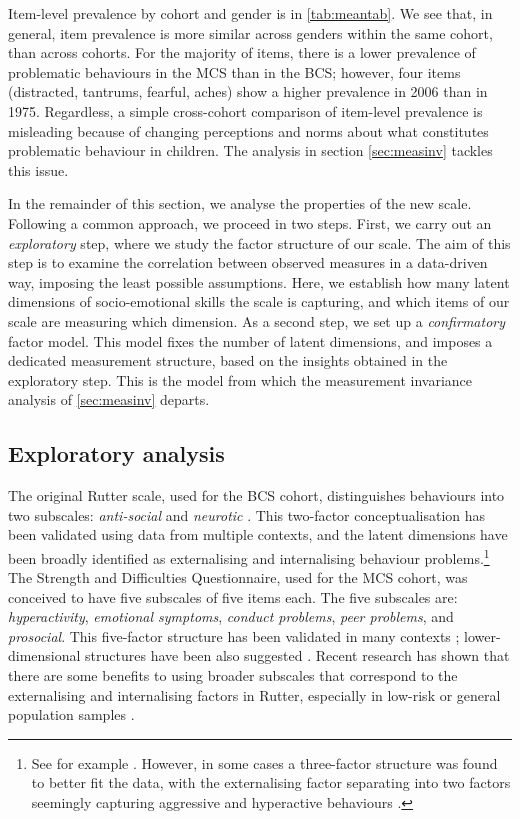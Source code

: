 Item-level prevalence by cohort and gender is in \autoref{tab:meantab}. We see that, in general, item prevalence is more similar across genders within the same cohort, than across cohorts. For the majority of items, there is a lower prevalence of problematic behaviours in the MCS than in the BCS; however, four items (distracted, tantrums, fearful, aches) show a higher prevalence in 2006 than in 1975. Regardless, a simple cross-cohort comparison of item-level prevalence is misleading because of changing perceptions and norms about what constitutes problematic behaviour in children. The analysis in section \ref{sec:measinv} tackles this issue.

In the remainder of this section, we analyse the properties of the new scale. Following a common approach, we proceed in two steps. First, we carry out an \emph{exploratory} step, where we study the factor structure of our scale. The aim of this step is to examine the correlation between observed measures in a data-driven way, imposing the least possible assumptions. Here, we establish how many latent dimensions of socio-emotional skills the scale is capturing, and which items of our scale are measuring which dimension. As a second step, we set up a \emph{confirmatory} factor model. This model fixes the number of latent dimensions, and imposes a dedicated measurement structure, based on the insights obtained in the exploratory step. This is the model from which the measurement invariance analysis of \autoref{sec:measinv} departs.


\subsection{Exploratory analysis \label{sec:ea}}

The original Rutter scale, used for the BCS cohort, distinguishes behaviours into two subscales: \emph{anti-social} and \emph{neurotic} \citep{Rutter1970}. This two-factor conceptualisation has been validated using data from multiple contexts, and the latent dimensions have been broadly identified as externalising and internalising behaviour problems.\footnote{See for example \citet{Fowler1979,Venables1983,Tremblay1987,Berglund1999,Klein2009}. However, in some cases a three-factor structure was found to better fit the data, with the externalising factor separating into two factors seemingly capturing aggressive and hyperactive behaviours \citep{Behar1974,McGee1985}.} The Strength and Difficulties Questionnaire, used for the MCS cohort, was conceived to have five subscales of five items each. The five subscales are: \emph{hyperactivity}, \emph{emotional symptoms}, \emph{conduct problems}, \emph{peer problems}, and \emph{prosocial}. This five-factor structure has been validated in many contexts \citep{Stone2010}; lower-dimensional structures have been also suggested \citep{Dickey2004}. Recent research has shown that there are some benefits to using broader subscales that correspond to the externalising and internalising factors in Rutter, especially in low-risk or general population samples \citep{Goodman2010}.

